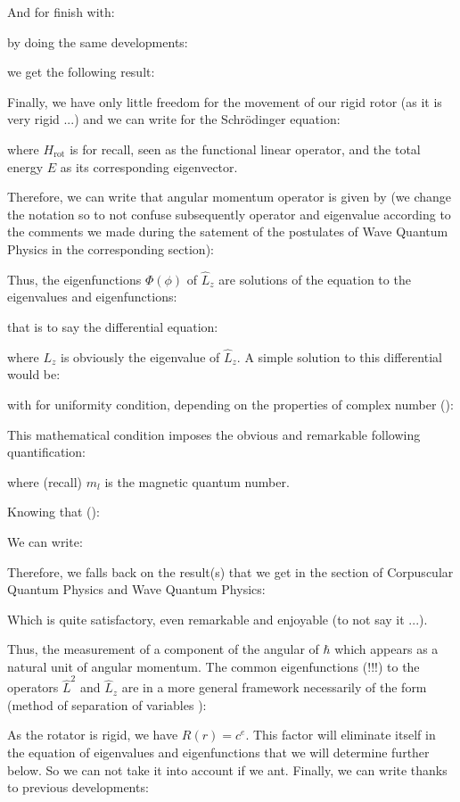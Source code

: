 	And for finish with:
	
	by doing the same developments:
	
	we get the following result:
	
	Finally, we have only little freedom for the movement of our rigid rotor (as it is very rigid ...) and we can write for the Schrödinger equation:
	
	where $H_\text{rot}$ is for recall, seen as the functional linear operator, and the total energy $E$ as its corresponding eigenvector.

	Therefore, we can write that angular momentum operator is given by (we change the notation so to not confuse subsequently operator and eigenvalue according to the comments we made during the satement of the postulates of Wave Quantum Physics in the corresponding section):
	
	Thus, the eigenfunctions $\Phi(\phi)$ of $\hat{L}_z$ are solutions of the equation to the eigenvalues and eigenfunctions:
	
	that is to say the differential equation:
	
	where $L_z$ is obviously the eigenvalue of $\hat{L}_z$. A simple solution to this differential would be:
	
	with for uniformity condition, depending on the properties of complex number ():
	
	This mathematical condition imposes the obvious and remarkable following quantification:
	
	where (recall) $m_l$ is the magnetic quantum number.

	Knowing that ():
	
	We can write:
	
	Therefore, we falls back on the result(s) that we get in the section of Corpuscular Quantum Physics and Wave Quantum Physics:
	
	Which is quite satisfactory, even remarkable and enjoyable (to not say it ...).
	
	Thus, the measurement of a component of the angular of $\hbar$ which appears as a natural unit of angular momentum.
	The common eigenfunctions (!!!) to the operators $\hat{L}^2$ and $\hat{L}_z$ are in a more general framework necessarily of the form (method of separation of variables ):
	
	As the rotator is rigid, we have $R(r)=c^{e}$. This factor will eliminate itself in the equation of eigenvalues and eigenfunctions that we will determine further below. So we can not take it into account if we ant. Finally, we can write thanks to previous developments:
	
